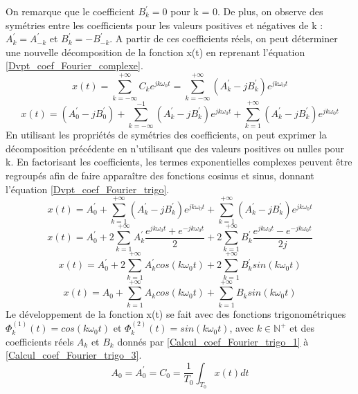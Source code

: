 	On remarque que le coefficient  $B_{k}^{'}=0$ pour k = 0. De plus, on observe des symétries entre les coefficients pour les valeurs positives et négatives de k : $A_{k}^{'}=A_{-k}^{'}$ et $B_{k}^{'}=-B_{-k}^{'}$.
	A partir de ces coefficients réels, on peut déterminer une nouvelle décomposition de la fonction x(t) en reprenant l'équation \ref{Dvpt_coef_Fourier_complexe}.
	\begin{equation*}
	x(t)=\sum_{k=-\infty}^{+\infty}C_{k}e^{jk\omega_{0}t}=\sum_{k=-\infty}^{+\infty}(A_{k}^{'}-jB_{k}^{'})e^{jk\omega_{0}t}
	\end{equation*}
	\begin{equation*}
	x(t)=(A_{0}^{'}-jB_{0}^{'})+\sum_{k=-\infty}^{-1}(A_{k}^{'}-jB_{k}^{'})e^{jk\omega_{0}t}+\sum_{k=1}^{+\infty}(A_{k}^{'}-jB_{k}^{'})e^{jk\omega_{0}t}
	\end{equation*}
	En utilisant les propriétés de symétries des coefficients, on peut exprimer la décomposition précédente en n'utilisant que des valeurs positives ou nulles pour k. En factorisant les coefficients, les termes exponentielles complexes peuvent être regroupés afin de faire apparaître des fonctions cosinus et sinus, donnant l'équation \ref{Dvpt_coef_Fourier_trigo}. 
	\begin{equation*}
	x(t)=A_{0}^{'}+\sum_{k=1}^{+\infty}(A_{k}^{'}-jB_{k}^{'})e^{jk\omega_{0}t}+\sum_{k=1}^{+\infty}(A_{k}^{'}-jB_{k}^{'})e^{jk\omega_{0}t}
	\end{equation*}
	\begin{equation*}
	x(t)=A_{0}^{'}+2\sum_{k=1}^{+\infty}A_{k}^{'}\frac{e^{jk\omega_{0}t}+e^{-jk\omega_{0}t}}{2}+2\sum_{k=1}^{+\infty}B_{k}^{'}\frac{e^{jk\omega_{0}t}-e^{-jk\omega_{0}t}}{2j}
	\end{equation*}
	\begin{equation*}
	x(t)=A_{0}^{'}+2\sum_{k=1}^{+\infty}A_{k}^{'}cos(k\omega_{0}t)+2\sum_{k=1}^{+\infty}B_{k}^{'}sin(k\omega_{0}t)
	\end{equation*}
	\begin{equation}\label{Dvpt_coef_Fourier_trigo}
	x(t)=A_{0}+\sum_{k=1}^{+\infty}A_{k}cos(k\omega_{0}t)+\sum_{k=1}^{+\infty}B_{k}sin(k\omega_{0}t)
	\end{equation}
	Le développement de la fonction x(t) se fait avec des fonctions trigonométriques $\Phi_{k}^{(1)}(t)=cos(k\omega_{0}t)$ et $\Phi_{k}^{(2)}(t)=sin(k\omega_{0}t)$, avec $k \in \mathbb{N}^{+}$ et des coefficients réels $A_{k}$ et $B_{k}$ donnés par \ref{Calcul_coef_Fourier_trigo_1} à \ref{Calcul_coef_Fourier_trigo_3}. 
	\begin{equation}\label{Calcul_coef_Fourier_trigo_1}
	A_{0}=A_{0}^{'}=C_{0}=\frac{1}{T_{0}}\int_{T_{0}}x(t)dt
	\end{equation}
